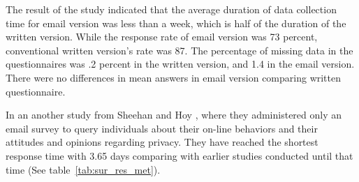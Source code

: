The result of the study indicated that the average duration of data collection time for email version was less than a week, which is half of the duration of the written version. While the response rate of email version was 73 percent, conventional written version's rate was 87. The percentage of missing data in the questionnaires was .2 percent in the written version, and 1.4 in the email version. There were no differences in mean answers in email version comparing written questionnaire.
\vspace{1cm}

In an another study from Sheehan and Hoy \citep{Sheehan2006}, where they administered only an email survey to query individuals about their on-line behaviors and their attitudes and opinions regarding privacy. They have reached the shortest response time with 3.65 days comparing with earlier studies conducted until that time (See table~\ref{tab:sur_res_met}).

